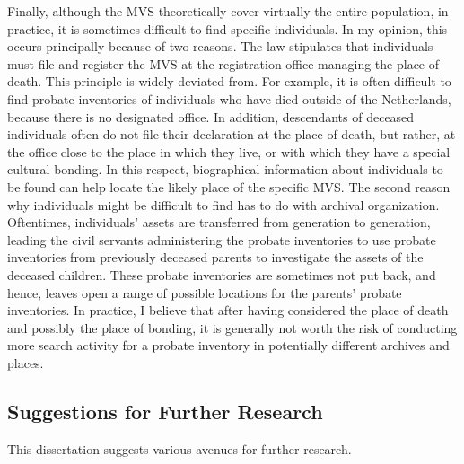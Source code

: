 Finally, although the MVS theoretically cover virtually the entire population, in practice, it is sometimes difficult to find specific individuals. In my opinion, this occurs principally because of two reasons. The law stipulates that individuals must file and register the MVS at the registration office managing the place of death. This principle is widely deviated from. For example, it is often difficult to find probate inventories of individuals who have died outside of the Netherlands, because there is no designated office. In addition, descendants of deceased individuals often do not file their declaration at the place of death, but rather, at the office close to the place in which they live, or with which they have a special cultural bonding. In this respect, biographical information about individuals to be found can help locate the likely place of the specific MVS. The second reason why individuals might be difficult to find has to do with archival organization. Oftentimes, individuals' assets are transferred from generation to generation, leading the civil servants administering the probate inventories to use probate inventories from previously deceased parents to investigate the assets of the deceased children. These probate inventories are sometimes not put back, and hence, leaves open a range of possible locations for the parents' probate inventories. In practice, I believe that after having considered the place of death and possibly the place of bonding, it is generally not worth the risk of conducting more search activity for a probate inventory in potentially different archives and places.  





\subsection{Suggestions for Further Research}\label{sec:sfr}


This dissertation suggests various avenues for further research. 

